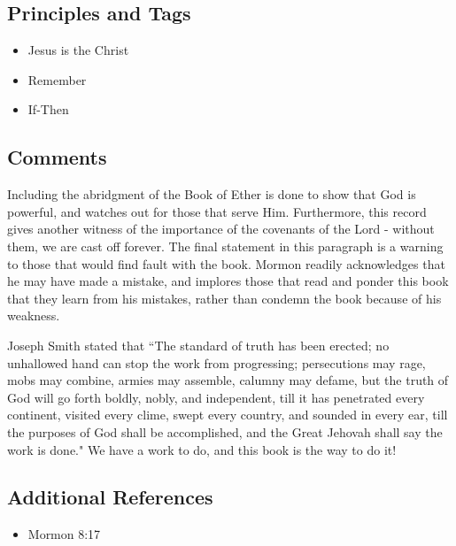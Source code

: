 \documentclass[12pt]{report}
\begin{document}
\subsection{Principles and Tags\label{titlePage:principles3}}
\begin{itemize}
\item {}Jesus is the Christ
\item {}Remember
\item {}If-Then
\end{itemize}

\subsection{Comments\label{titlePage_comments3}}
Including the abridgment of the Book of Ether is done to show that God is powerful, and watches out for those that serve Him.  Furthermore, this record gives another witness of the importance of the covenants of the Lord - without them, we are cast off forever.  The final statement in this paragraph is a warning to those that would find fault with the book.  Mormon readily acknowledges that he may have made a mistake, and implores those that read and ponder this book that they learn from his mistakes, rather than condemn the book because of his weakness.

Joseph Smith stated that ``The standard of truth has been erected; no unhallowed hand can stop the work from progressing; persecutions may rage, mobs may combine, armies may assemble, calumny may defame, but the truth of God will go forth boldly, nobly, and independent, till it has penetrated every continent, visited every clime, swept every country, and sounded in every ear, till the purposes of God shall be accomplished, and the Great Jehovah shall say the work is done."  We have a work to do, and this book is the way to do it!

\subsection{Additional References\label{titlePage:references3}}
\begin{itemize}
\item Mormon 8:17
\end{itemize}

\end{document}
